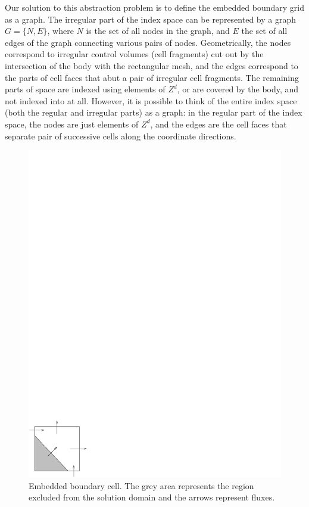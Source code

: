 Our solution to this abstraction problem is to
define the embedded boundary grid as a graph.
The irregular part of the index space can be represented by a graph 
$G = \{N,E\}$, where $N$ is the set of all nodes in the graph, and 
$E$ the set of all edges of the graph connecting various pairs of 
nodes. Geometrically,
the nodes correspond to irregular control volumes (cell fragments) 
cut out by the intersection of the body with the rectangular mesh, and 
the edges correspond to the parts of cell faces that abut a pair of irregular 
cell fragments. The remaining parts of space are indexed using elements
of $Z^d$, or are covered by the body, and not indexed into at all. However,
it is possible to think of the entire index space (both the regular and
irregular parts) as a graph: in the regular part of the index space,
the nodes are just elements of $Z^d$, and the 
edges are the cell faces that
separate pair of successive cells along the coordinate directions. 


\begin{figure}
  \centering
  \includegraphics[width=\textwidth]{./EB/volume.pdf}
\caption{\label{fig::volume}Embedded boundary cell. The grey area represents 
the region excluded from the solution domain and the arrows represent
fluxes.}
\end{figure}

